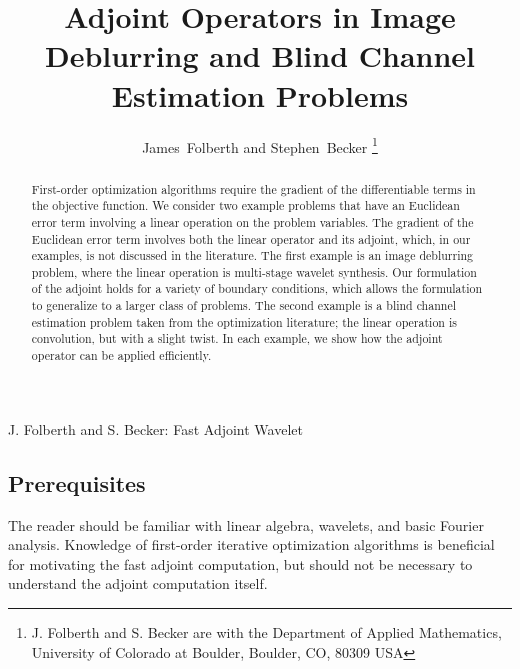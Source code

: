 \documentclass[journal]{IEEEtran}
\begin{document}
\title{Adjoint Operators in Image Deblurring and Blind Channel Estimation Problems}
\author{James~Folberth and 
        Stephen~Becker%
\thanks{J. Folberth and S. Becker are with the Department
of Applied Mathematics, University of Colorado at Boulder,
Boulder, CO, 80309 USA}}

%
{J. Folberth and S. Becker: Fast Adjoint Wavelet}

\maketitle

\begin{abstract}
   First-order optimization algorithms require the gradient of the differentiable terms in the objective function.  We consider two example problems that have an Euclidean error term involving a linear operation on the problem variables.  The gradient of the Euclidean error term involves both the linear operator and its adjoint, which, in our examples, is not discussed in the literature.  The first example is an image deblurring problem, where the linear operation is multi-stage wavelet synthesis.  Our formulation of the adjoint holds for a variety of boundary conditions, which allows the formulation to generalize to a larger class of problems.  The second example is a blind channel estimation problem taken from the optimization literature; the linear operation is convolution, but with a slight twist.  In each example, we show how the adjoint operator can be applied efficiently.
\end{abstract}

\subsection*{Prerequisites}
The reader should be familiar with linear algebra, wavelets, and basic Fourier analysis.  Knowledge of first-order iterative optimization algorithms is beneficial for motivating the fast adjoint computation, but should not be necessary to understand the adjoint computation itself.\\
\end{document}
